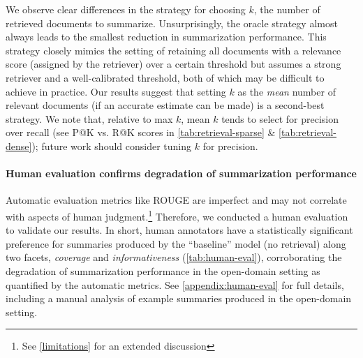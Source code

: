 \documentclass[11pt]{article}
\begin{document}
We observe clear differences in the strategy for choosing \(k\), the number of retrieved documents to summarize. Unsurprisingly, the oracle strategy almost always leads to the smallest reduction in summarization performance. This strategy closely mimics the setting of retaining all documents with a relevance score (assigned by the retriever) over a certain threshold but assumes a strong retriever and a well-calibrated threshold, both of which may be difficult to achieve in practice. Our results suggest that setting \(k\) as the \textit{mean} number of relevant documents (if an accurate estimate can be made) is a second-best strategy. We note that, relative to max \(k\), mean \(k\) tends to select for precision over recall (see P@K vs. R@K scores in \autoref{tab:retrieval-sparse} \& \autoref{tab:retrieval-dense}); future work should consider tuning \(k\) for precision.

\paragraph{Human evaluation confirms degradation of summarization performance}

Automatic evaluation metrics like ROUGE are imperfect and may not correlate with aspects of human judgment.\footnote{See \textsection \ref{limitations} for an extended discussion} Therefore, we conducted a human evaluation to validate our results. In short, human annotators have a statistically significant preference for summaries produced by the ``baseline'' model (no retrieval) along two facets, \textit{coverage} and \textit{informativeness} (\autoref{tab:human-eval}), corroborating the degradation of summarization performance in the open-domain setting as quantified by the automatic metrics. See \autoref{appendix:human-eval} for full details, including a manual analysis of example summaries produced in the open-domain setting.

\begin{table}[t]
\centering
\caption{Human evaluation on Multi-News. A binomial test on three human annotators for \(n=50\) random test examples was conducted for each facet (excluding ties). All results \underline{statistically significant} (p~\(<\)~0.01). Inter-annotator agreement reported as Fleiss' Kappa (\(\kappa\)).}
\label{tab:human-eval}
\vspace{-3.5mm}
\end{table}
\end{document}
